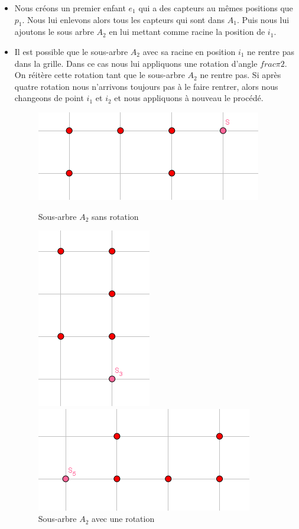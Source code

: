 \documentclass[12pt,a4paper]{article}
\begin{document}
\begin{itemize}
\item Nous créons un premier enfant $e_1$ qui a des capteurs au mêmes positions que $p_1$. Nous lui enlevons alors tous les capteurs qui sont dans $A_1$. Puis nous lui ajoutons le sous arbre $A_2$ en lui mettant comme racine la position de $i_1$. 
\item Il est possible que le sous-arbre $A_2$ avec sa racine en position $i_1$ ne rentre pas dans la grille. Dans ce cas nous lui appliquons une rotation d'angle $frac{\pi}{2}$. On réitère cette rotation tant que le sous-arbre $A_2$ ne rentre pas. Si après quatre rotation nous n'arrivons toujours pas à le faire rentrer, alors nous changeons de point $i_1$ et $i_2$ et nous appliquons à nouveau le procédé.
\begin{figure}[h]
\center
\includegraphics[scale=1]{Images/r_1.png}
\caption{Sous-arbre $A_2$ sans rotation}
\includegraphics[scale=1]{Images/r_2.png}
\caption{Sous-arbre $A_2$ avec une rotation}
\includegraphics[scale=1]{Images/r_3.png}

\end{figure}
\end{itemize}
\end{document}
